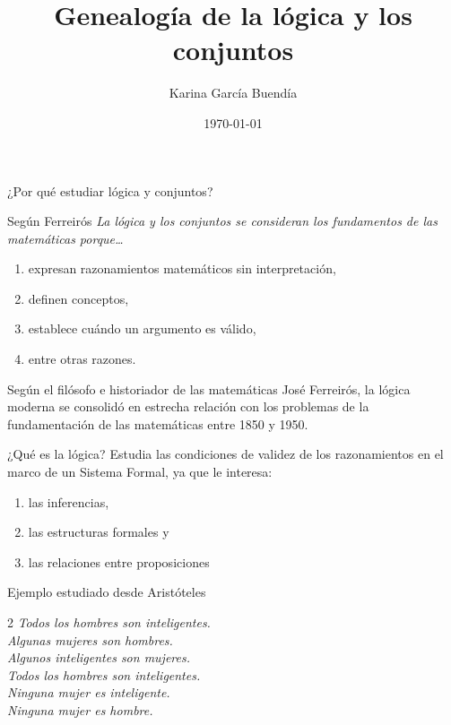 \documentclass{beamer}
\title{Genealogía de la lógica y los conjuntos}
\author{Karina García Buendía}
\date{\today}
\begin{document}
\begin{frame}
\titlepage
\end{frame}

\begin{frame}{¿Por qué estudiar lógica y conjuntos?}
    \begin{block}{Según Ferreirós}
        \textit {La lógica y los conjuntos se consideran los fundamentos de
        las matemáticas porque\dots}
        \pause
        \begin{enumerate}
            \item expresan razonamientos matemáticos sin interpretación,
            \item definen conceptos,
            \item establece cuándo un argumento es válido, 
            \item entre otras razones.
        \end{enumerate}
        \pause
    \end{block}
     
        Según el filósofo e historiador de las matemáticas José Ferreirós, la lógica moderna se consolidó 
        en estrecha relación con los problemas de la fundamentación de las matemáticas entre 1850 y 1950.
   \end{frame}

    \begin{frame}{¿Qué es la lógica?}
        Estudia las condiciones de validez de los razonamientos en el marco de un Sistema Formal, ya que le interesa:    

        \begin{enumerate}
            \item las inferencias,
            \pause
            \item las estructuras formales y
            \pause
            \item las relaciones entre proposiciones
        \end{enumerate}

    \begin{block}{Ejemplo estudiado desde Aristóteles}
             \begin{multicols}{2}
      \textit{
        Todos los hombres son inteligentes. \\
        Algunas mujeres son hombres. \\
        Algunos inteligentes son mujeres. \\
        Todos los hombres son inteligentes. \\
        Ninguna mujer es inteligente. \\
        Ninguna mujer es hombre.
      }
    \end{multicols}
    \end{block}
\end{frame}
\end{document}
